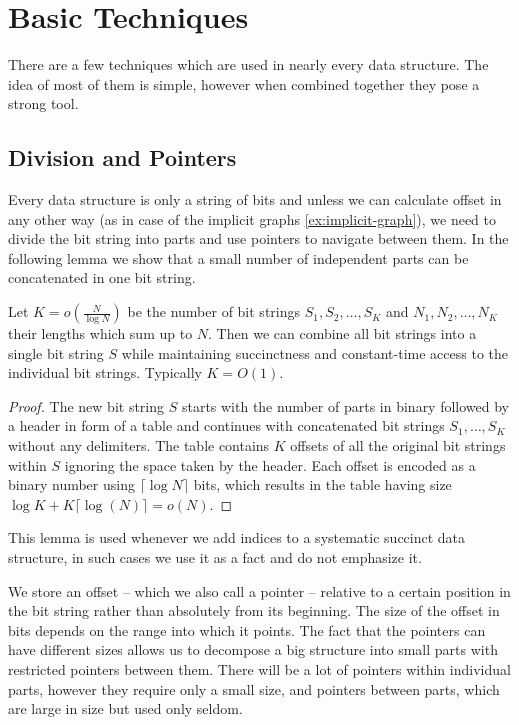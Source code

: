\section{Basic Techniques}

There are a few techniques which are used in nearly every data structure.
The idea of most of them is simple, however when combined together they pose a strong tool.

\subsection{Division and Pointers}

Every data structure is only a string of bits and unless we can calculate offset in any other way (as in case of the implicit graphs \ref{ex:implicit-graph}), we need to divide the bit string into parts and use pointers to navigate between them.
In the following lemma we show that a small number of independent parts can be concatenated in one bit string.

\begin{lemma}\label{l:concat}
	Let $K = o\left(\frac{N}{\log N}\right)$ be the number of bit strings $S_1, S_2, \ldots, S_K$ and $N_1, N_2, \dots, N_K$ their lengths which sum up to $N$.
	Then we can combine all bit strings into a single bit string $S$ while maintaining succinctness and constant-time access to the individual bit strings.
	Typically $K = O(1)$.
\end{lemma}
\begin{proof}
	The new bit string $S$ starts with the number of parts in binary followed by a header in form of a table and continues with concatenated bit strings $S_1, \ldots, S_K$ without any delimiters.
	The table contains $K$ offsets of all the original bit strings within $S$ ignoring the space taken by the header.
	Each offset is encoded as a binary number using $\lceil \log N \rceil$ bits, which results in the table having size $\log K + K \lceil \log (N) \rceil = o(N)$.
\end{proof}

This lemma is used whenever we add indices to a systematic succinct data structure, in such cases we use it as a fact and do not emphasize it.

We store an offset -- which we also call a pointer -- relative to a certain position in the bit string rather than absolutely from its beginning.
The size of the offset in bits depends on the range into which it points.
The fact that the pointers can have different sizes allows us to decompose a big structure into small parts with restricted pointers between them.
There will be a lot of pointers within individual parts, however they require only a small size, and pointers between parts, which are large in size but used only seldom.

